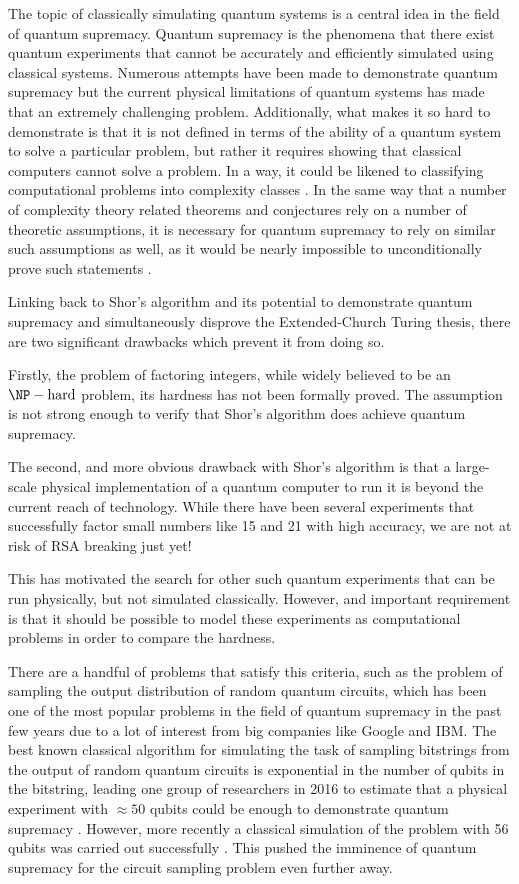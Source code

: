 \documentclass[11pt]{article}
\theoremstyle{theorem}
\theoremstyle{remark}
\theoremstyle{plain}
\theoremstyle{definition}
\begin{document}
The topic of classically simulating quantum systems is a central idea in the field of quantum supremacy. Quantum supremacy is the phenomena that there exist quantum experiments that cannot be accurately and efficiently simulated using classical systems. Numerous attempts have been made to demonstrate quantum supremacy but the current physical limitations of quantum systems has made that an extremely challenging problem. Additionally, what makes it so hard to demonstrate is that it is not defined in terms of the ability of a quantum system to solve a particular problem, but rather it requires showing that classical computers cannot solve a problem. In a way, it could be likened to classifying computational problems into complexity classes \cite{papadimitriou2003}. In the same way that a number of complexity theory related theorems and conjectures rely on a number of theoretic assumptions, it is necessary for quantum supremacy to rely on similar such assumptions as well, as it would be nearly impossible to unconditionally prove such statements \cite{harrow2017}.

Linking back to Shor's algorithm and its potential to demonstrate quantum supremacy and simultaneously disprove the Extended-Church Turing thesis, there are two significant drawbacks which prevent it from doing so. 

Firstly, the problem of factoring integers, while widely believed to be an $\NP-\text{hard}$ problem, its hardness has not been formally proved. The assumption is not strong enough to verify that Shor's algorithm does achieve quantum supremacy.

The second, and more obvious drawback with Shor's algorithm is that a large-scale physical implementation of a quantum computer to run it is beyond the current reach of technology. While there have been several experiments that successfully factor small numbers like 15 \cite{monz2016} and 21 \cite{vartiainen2004} with high accuracy, we are not at risk of RSA breaking just yet!

This has motivated the search for other such quantum experiments that can be run physically, but not simulated classically. However, and important requirement is that it should be possible to model these experiments as computational problems in order to compare the hardness.

There are a handful of problems that satisfy this criteria, such as the problem of sampling the output distribution of random quantum circuits, which has been one of the most popular problems in the field of quantum supremacy in the past few years due to a lot of interest from big companies like Google and IBM. The best known classical algorithm for simulating the task of sampling bitstrings from the output of random quantum circuits is exponential in the number of qubits in the bitstring, leading one group of researchers in 2016 to estimate that a physical experiment with $\approx 50$ qubits could be enough to demonstrate quantum supremacy \cite{boixo2016}. However, more recently a classical simulation of the problem with 56 qubits was carried out successfully \cite{pednault2017}. This pushed the imminence of quantum supremacy for the circuit sampling problem even further away.
\end{document}
